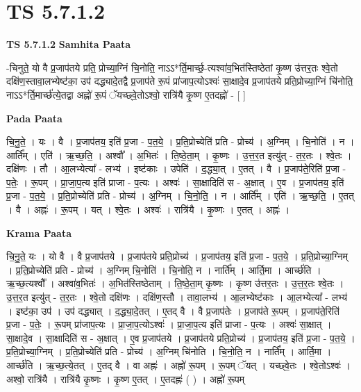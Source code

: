 \documentclass[17pt]{extarticle}
\begin{document}
\section{ TS 5.7.1.2 }

\textbf{TS 5.7.1.2 } \newline
\textbf{Samhita Paata} \newline

-चिनुते॒ यो वै प्र॒जाप॑तये प्रति॒ प्रोच्या॒ग्निं चि॒नोति॒ नाऽऽ*र्ति॒मार्च्छ॒-त्यश्वा॑व॒भित॑स्तिष्ठेतां कृ॒ष्ण उ॑त्तर॒तः श्वे॒तो दक्षि॑ण॒स्तावा॒लभ्येष्ट॑का॒ उप॑ दद्ध्यादे॒तद्वै प्र॒जाप॑ते रू॒पं प्रा॑जाप॒त्योऽश्वः॑ सा॒क्षादे॒व प्र॒जाप॑तये प्रति॒प्रोच्या॒ग्निं चि॑नोति॒ नाऽऽ*र्ति॒मार्च्छ॑त्ये॒तद्वा अह्नो॑ रू॒पं ॅयच्छ्वे॒तोऽश्वो॒ रात्रि॑यै कृ॒ष्ण ए॒तदह्नो॑ - [  ] \newline

\textbf{Pada Paata} \newline

चि॒नु॒ते॒ । यः । वै । प्र॒जाप॑तय॒ इति॑ प्र॒जा -  प॒त॒ये॒ । प्र॒ति॒प्रोच्येति॑ प्रति - प्रोच्य॑ । अ॒ग्निम् । चि॒नोति॑ । न । आर्ति᳚म् । एति॑ । ऋ॒च्छ॒ति॒ । अश्वौ᳚ । अ॒भितः॑ । ति॒ष्ठे॒ता॒म् । कृ॒ष्णः । उ॒त्त॒र॒त इत्यु॑त् -   त॒र॒तः । श्वे॒तः । दक्षि॑णः । तौ । आ॒लभ्येत्या᳚ - लभ्य॑ । इष्ट॑काः । उपेति॑ । द॒द्ध्या॒त् । ए॒तत् । वै । प्र॒जाप॑ते॒रिति॑ प्र॒जा - प॒तेः॒ । रू॒पम् । प्रा॒जा॒प॒त्य इति॑ प्राजा - प॒त्यः । अश्वः॑ । सा॒क्षादिति॑ स - अ॒क्षात् । ए॒व । प्र॒जाप॑तय॒ इति॑ प्र॒जा - प॒त॒ये॒ । प्र॒ति॒प्रोच्येति॑ प्रति - प्रोच्य॑ । अ॒ग्निम् । चि॒नो॒ति॒ । न । आर्ति᳚म् । एति॑ । ऋ॒च्छ॒ति॒ । ए॒तत् । वै । अह्नः॑ । रू॒पम् । यत् । श्वे॒तः । अश्वः॑ । रात्रि॑यै । कृ॒ष्णः । ए॒तत् । अह्नः॑ ।  \newline


\textbf{Krama Paata} \newline

चि॒नु॒ते॒ यः । यो वै । वै प्र॒जाप॑तये । प्र॒जाप॑तये प्रति॒प्रोच्य॑ । प्र॒जाप॑तय॒ इति॑ प्र॒जा - प॒त॒ये॒ । प्र॒ति॒प्रोच्या॒ग्निम् । प्र॒ति॒प्रोच्येति॑ प्रति - प्रोच्य॑ । अ॒ग्निम् चि॒नोति॑ । चि॒नोति॒ न । नार्ति᳚म् । आर्ति॒मा । आर्च्छ॑ति । ऋ॒च्छ॒त्यश्वौ᳚ । अश्वा॑व॒भितः॑ । अ॒भित॑स्तिष्ठेताम् । ति॒ष्ठे॒ता॒म् कृ॒ष्णः । कृ॒ष्ण उ॑त्तर॒तः । उ॒त्त॒र॒तः श्वे॒तः । उ॒त्त॒र॒त इत्यु॑त् - त॒र॒तः । श्वे॒तो दक्षि॑णः । दक्षि॑ण॒स्तौ । तावा॒लभ्य॑ । आ॒लभ्येष्ट॑काः । आ॒लभ्येत्या᳚ - लभ्य॑ । इष्ट॑का॒ उप॑ । उप॑ दद्ध्यात् । द॒द्ध्या॒दे॒तत् । ए॒तद् वै । वै प्र॒जाप॑तेः । प्र॒जाप॑ते रू॒पम् । प्र॒जाप॑ते॒रिति॑ प्र॒जा - प॒तेः॒ । रू॒पम् प्रा॑जाप॒त्यः । प्रा॒जा॒प॒त्योऽश्वः॑ । प्रा॒जा॒प॒त्य इति॑ प्राजा - प॒त्यः । अश्वः॑ सा॒क्षात् । सा॒क्षादे॒व । सा॒क्षादिति॑ स - अ॒क्षात् । ए॒व प्र॒जाप॑तये । प्र॒जाप॑तये प्रति॒प्रोच्य॑ । प्र॒जाप॑तय॒ इति॑ प्र॒जा - प॒त॒ये॒ । प्र॒ति॒प्रोच्या॒ग्निम् । प्र॒ति॒प्रोच्येति॑ प्रति - प्रोच्य॑ । अ॒ग्निम् चि॑नोति । चि॒नो॒ति॒ न । नार्ति᳚म् । आर्ति॒मा । आर्च्छ॑ति । ऋ॒च्छ॒त्ये॒तत् । ए॒तद् वै । वा अह्नः॑ । अह्नो॑ रू॒पम् । रू॒पम् ॅयत् । यच्छ्वे॒तः । श्वे॒तोऽश्वः॑ । अश्वो॒ रात्रि॑यै । रात्रि॑यै कृ॒ष्णः । कृ॒ष्ण ए॒तत् । ए॒तदह्नः॑ ( ) । अह्नो॑ रू॒पम् \newline
\end{document}
